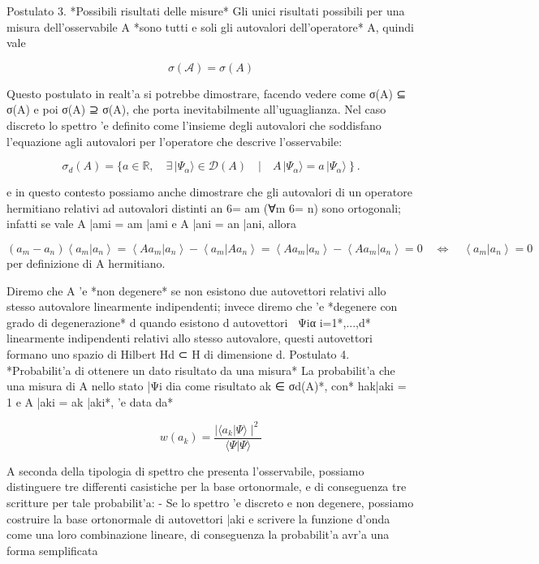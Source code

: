 Postulato 3. *Possibili risultati delle misure* Gli unici risultati possibili per una misura dell'osservabile A *sono tutti e soli gli autovalori dell'operatore* A,
quindi vale

$$\sigma({\mathcal{A}})=\sigma(A)$$

Questo postulato in realt'a si potrebbe dimostrare, facendo vedere come σ(A) ⊆ σ(A) e poi σ(A) ⊇ σ(A), che porta inevitabilmente all'uguaglianza. Nel caso discreto lo spettro 'e definito come l'insieme degli autovalori che soddisfano l'equazione agli autovalori per l'operatore che descrive l'osservabile:

$$\sigma_{d}(A)=\{a\in\mathbb{R},\quad\exists\,|\Psi_{\alpha}\rangle\in\mathcal{D}(A)\quad\left|\quad A\,|\Psi_{\alpha}\rangle=a\,|\Psi_{\alpha}\rangle\right\}.$$

e in questo contesto possiamo anche dimostrare che gli autovalori di un operatore hermitiano relativi ad autovalori distinti an 6= am (∀m 6= n) sono ortogonali; infatti se vale A |ami = am |ami e A |ani = an |ani, allora

$\left(a_{m}-a_{n}\right)\left\langle a_{m}|a_{n}\right\rangle=\left\langle Aa_{m}|a_{n}\right\rangle-\left\langle a_{m}|Aa_{n}\right\rangle=\left\langle Aa_{m}|a_{n}\right\rangle-\left\langle Aa_{m}|a_{n}\right\rangle=0\quad\Longleftrightarrow\quad\left\langle a_{m}|a_{n}\right\rangle=0$
per definizione di A hermitiano.

Diremo che A 'e *non degenere* se non esistono due autovettori relativi allo stesso autovalore linearmente indipendenti; invece diremo che 'e *degenere con grado di degenerazione* d quando esistono d autovettori {Ψiα
}i=1*,...,d* linearmente indipendenti relativi allo stesso autovalore, questi autovettori formano uno spazio di Hilbert Hd ⊂ H
di dimensione d. Postulato 4. *Probabilit'a di ottenere un dato risultato da una misura* La probabilit'a che una misura di A nello stato |Ψi dia come risultato ak ∈ σd(A)*, con* hak|aki = 1 e A |aki =
ak |aki*, 'e data da*

$$w(a_{k})={\frac{\mid\langle a_{k}|\Psi\rangle\mid^{2}}{\langle\Psi|\Psi\rangle}}$$

A seconda della tipologia di spettro che presenta l'osservabile, possiamo distinguere tre differenti casistiche per la base ortonormale, e di conseguenza tre scritture per tale probabilit'a:
- Se lo spettro 'e discreto e non degenere, possiamo costruire la base ortonormale di autovettori {|aki} e scrivere la funzione d'onda come una loro combinazione lineare, di conseguenza la probabilit'a avr'a una forma semplificata


